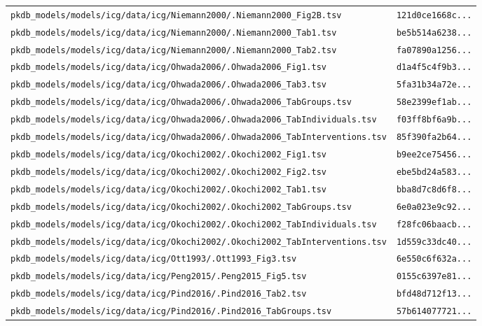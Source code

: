 \documentclass{article}
\begin{document}
\begin{longtable}{ll}
\texttt{pkdb\_models/models/icg/data/icg/Niemann2000/.Niemann2000\_Fig2B.tsv} & \texttt{121d0ce1668c...} \\
\texttt{pkdb\_models/models/icg/data/icg/Niemann2000/.Niemann2000\_Tab1.tsv} & \texttt{be5b514a6238...} \\
\texttt{pkdb\_models/models/icg/data/icg/Niemann2000/.Niemann2000\_Tab2.tsv} & \texttt{fa07890a1256...} \\
\texttt{pkdb\_models/models/icg/data/icg/Ohwada2006/.Ohwada2006\_Fig1.tsv} & \texttt{d1a4f5c4f9b3...} \\
\texttt{pkdb\_models/models/icg/data/icg/Ohwada2006/.Ohwada2006\_Tab3.tsv} & \texttt{5fa31b34a72e...} \\
\texttt{pkdb\_models/models/icg/data/icg/Ohwada2006/.Ohwada2006\_TabGroups.tsv} & \texttt{58e2399ef1ab...} \\
\texttt{pkdb\_models/models/icg/data/icg/Ohwada2006/.Ohwada2006\_TabIndividuals.tsv} & \texttt{f03ff8bf6a9b...} \\
\texttt{pkdb\_models/models/icg/data/icg/Ohwada2006/.Ohwada2006\_TabInterventions.tsv} & \texttt{85f390fa2b64...} \\
\texttt{pkdb\_models/models/icg/data/icg/Okochi2002/.Okochi2002\_Fig1.tsv} & \texttt{b9ee2ce75456...} \\
\texttt{pkdb\_models/models/icg/data/icg/Okochi2002/.Okochi2002\_Fig2.tsv} & \texttt{ebe5bd24a583...} \\
\texttt{pkdb\_models/models/icg/data/icg/Okochi2002/.Okochi2002\_Tab1.tsv} & \texttt{bba8d7c8d6f8...} \\
\texttt{pkdb\_models/models/icg/data/icg/Okochi2002/.Okochi2002\_TabGroups.tsv} & \texttt{6e0a023e9c92...} \\
\texttt{pkdb\_models/models/icg/data/icg/Okochi2002/.Okochi2002\_TabIndividuals.tsv} & \texttt{f28fc06baacb...} \\
\texttt{pkdb\_models/models/icg/data/icg/Okochi2002/.Okochi2002\_TabInterventions.tsv} & \texttt{1d559c33dc40...} \\
\texttt{pkdb\_models/models/icg/data/icg/Ott1993/.Ott1993\_Fig3.tsv} & \texttt{6e550c6f632a...} \\
\texttt{pkdb\_models/models/icg/data/icg/Peng2015/.Peng2015\_Fig5.tsv} & \texttt{0155c6397e81...} \\
\texttt{pkdb\_models/models/icg/data/icg/Pind2016/.Pind2016\_Tab2.tsv} & \texttt{bfd48d712f13...} \\
\texttt{pkdb\_models/models/icg/data/icg/Pind2016/.Pind2016\_TabGroups.tsv} & \texttt{57b614077721...} \\

\end{longtable}
\end{document}
